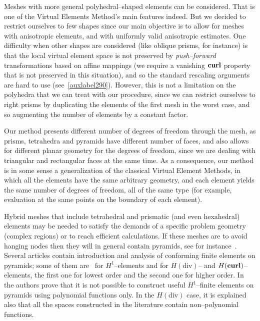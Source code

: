 Meshes with more general polyhedral--shaped elements can be considered. 
That is one of the Virtual Elements Method's main features indeed. 
But we decided to restrict
ourselves to few 
shapes since our main objective is to allow for meshes with anisotropic elements, 
and with uniformly valid anisotropic 
estimates. 
One 
difficulty when other shapes are considered (like
oblique prisms, for instance) is that the local virtual element space is not 
preserved by 
\emph{push--forward} transformations based on affine mappings
(we require a vanishing ${\bf curl}$ property that is not preserved in this 
situation), and so the standard rescaling arguments are hard to use 
(see~\ref{auxlabel290}). However, this is not a limitation on the polyhedra
that we can treat with our procedure, since we can restrict ourselves
to right prisms by duplicating the elements of the first mesh in the worst case,
and so augmenting the number of elements by a constant factor.

Our method presents different number of degrees of freedom through the 
mesh, as prisms, tetrahedra and pyramids have different number of faces, and also 
allows for different planar geometry for the degrees of freedom, since we are 
dealing
with triangular and rectangular faces at the same time. As a consequence, our 
method is in some sense a generalization of the classical Virtual Element Methods,
in which all the elements have the same arbitrary geometry, and each element yields
the same number of degrees of freedom, all of the same type (for example, 
evaluation at the same points on the boundary of each element).

Hybrid meshes that include tetrahedral and prismatic (and even hexahedral) 
elements may be needed to satisfy the demands of a specific problem geometry 
(complex regions) or to reach efficient calculations. If these meshes are 
to avoid hanging nodes then they will in general contain pyramids, see 
for instance~\cite{owenSaigal}. Several articles contain introduction and analysis
of conforming finite elements on pyramids; some of them are~\cite{bergot} 
for $H^1$--elements and 
\cite{gh99, Nigam-2012} for $H(\mbox{div})$-- and $H({\bf curl})$--elements, 
the first one for 
lowest order and the second one for higher order. 
In~\cite{Nigam-2012} the authors prove that it is not possible to construct 
useful $H^1$--finite 
elements on pyramids using  polynomial functions only. In the $H(\mbox{div})$ 
case, it is explained also that all the spaces 
constructed in the literature contain non--polynomial functions.

